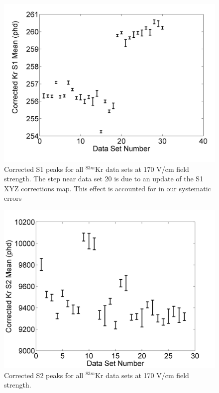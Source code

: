 \documentclass[a4paper,12pt]{article}
\begin{document}
{\begin{figure}[H]
\centering
\includegraphics[scale=0.4]{S1Variation.png}
\caption{Corrected S1 peaks for all $^{83m}$Kr data sets at 170 V/cm field strength.  The step near data set 20 is due to an update of the S1 XYZ corrections map.  This effect is accounted for in our systematic errors}
\label{S1Variation}
\end{figure}


\begin{figure}[H]
\centering
\includegraphics[scale=0.4]{S2Variation.png}
\caption{Corrected S2 peaks for all $^{83m}$Kr data sets at 170 V/cm field strength.}
\label{S2Variation}
\end{figure}

}
\end{document}
